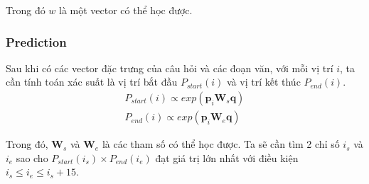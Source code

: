 Trong đó $w$ là một vector có thể học được. 

\subsubsection{Prediction}
Sau khi có các vector đặc trưng của câu hỏi và các đoạn văn, với mỗi vị trí $i$, ta cần tính toán xác suất là vị trí bắt đầu $P_{start}(i)$ và vị trí kết thúc $P_{end}(i)$.
\begin{gather*}
    P_{start}(i) \propto exp(\textbf{p}_{i}\textbf{W}_{s}\textbf{q})\\
    P_{end}(i) \propto exp(\textbf{p}_{i}\textbf{W}_{e}\textbf{q})
\end{gather*}

Trong đó, $\textbf{W}_{s}$ và $\textbf{W}_{e}$ là các tham số có thể học được. Ta sẽ cần tìm 2 chỉ số $i_s$ và $i_e$ sao cho $P_{start}(i_s) \times P_{end}(i_e)$ đạt giá trị lớn nhất với điều kiện $i_s \leq i_e \leq i_s + 15 $.
